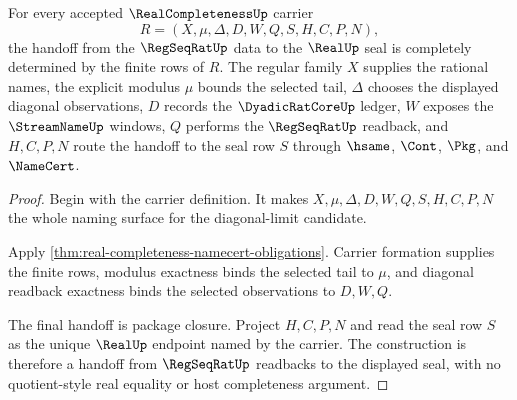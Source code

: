 \begin{theorem}
\label{thm:real-completeness-regseq-seal-handoff}
For every accepted $\RealCompletenessUp$ carrier
$$
R=(X,\mu,\Delta,D,W,Q,S,H,C,P,N),
$$
the handoff from the $\RegSeqRatUp$ data to the $\RealUp$ seal is completely determined by the finite rows of $R$. The regular family $X$ supplies the rational names, the explicit modulus $\mu$ bounds the selected tail, $\Delta$ chooses the displayed diagonal observations, $D$ records the $\DyadicRatCoreUp$ ledger, $W$ exposes the $\StreamNameUp$ windows, $Q$ performs the $\RegSeqRatUp$ readback, and $H,C,P,N$ route the handoff to the seal row $S$ through $\hsame$, $\Cont$, $\Pkg$, and $\NameCert$.
\end{theorem}
\begin{proof}
Begin with the carrier definition. It makes $X,\mu,\Delta,D,W,Q,S,H,C,P,N$ the whole naming surface for the diagonal-limit candidate.

Apply \autoref{thm:real-completeness-namecert-obligations}. Carrier formation supplies the finite rows, modulus exactness binds the selected tail to $\mu$, and diagonal readback exactness binds the selected observations to $D,W,Q$.

The final handoff is package closure. Project $H,C,P,N$ and read the seal row $S$ as the unique $\RealUp$ endpoint named by the carrier. The construction is therefore a handoff from $\RegSeqRatUp$ readbacks to the displayed seal, with no quotient-style real equality or host completeness argument.
\end{proof}

